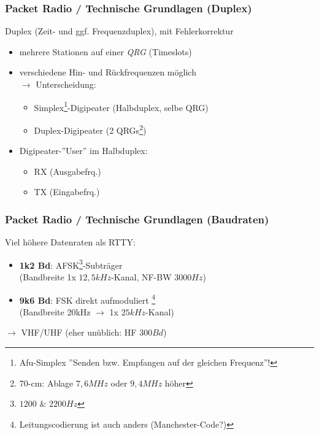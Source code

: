 \begin{frame}
    \frametitle{Packet Radio / Technische Grundlagen (Duplex)}

    Duplex (Zeit- und ggf. Frequenzduplex), mit Fehlerkorrektur

    \begin{itemize}
        \item mehrere Stationen auf einer \emph{QRG} (Timeslots)
        \item verschiedene Hin- und Rückfrequenzen möglich \\ $\rightarrow$
              Unterscheidung:
        \begin{itemize}
            \item Simplex\footnote{Afu-Simplex ''Senden bzw. Empfangen auf
                  der gleichen Frequenz''!}-Digipeater (Halbduplex, selbe QRG)
            \item Duplex-Digipeater (2 QRGs\footnote{70-cm: Ablage $7,6 MHz$
                  oder $9,4 MHz$ höher})
        \end{itemize}
        \item Digipeater-''User'' im Halbduplex:
        \begin{itemize}
            \item RX (Ausgabefrq.)
            \item TX (Eingabefrq.)
        \end{itemize}
    \end{itemize}

\end{frame}

\begin{frame}
    \frametitle{Packet Radio / Technische Grundlagen (Baudraten)}

    Viel höhere Datenraten als RTTY:

    \begin{itemize}
        \item \textbf{1k2 Bd}: AFSK\footnote{$1200$ \& $2200 Hz$}-Subträger \\
              (Bandbreite 1x $12,5kHz$-Kanal, NF-BW $3000 Hz$)
        \item \textbf{9k6 Bd}: FSK direkt aufmoduliert
              \footnote{Leitungscodierung ist auch anders (Manchester-Code?)} \\
              (Bandbreite 20kHz $\rightarrow$ 1x $25kHz$-Kanal)
    \end{itemize}

    $\rightarrow$ VHF/UHF (eher unüblich: HF $300 Bd$)

\end{frame}

